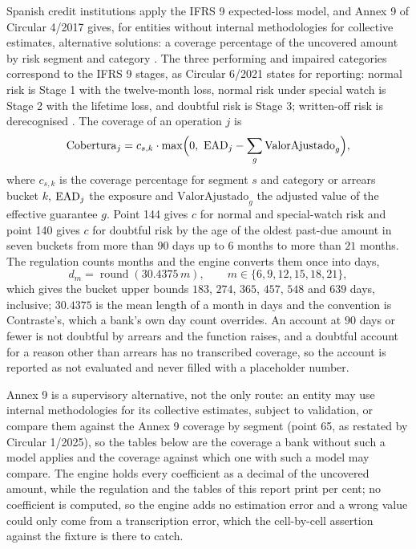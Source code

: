 Spanish credit institutions apply the IFRS 9 expected-loss model, and Annex 9 of Circular 4/2017 gives, for entities without internal methodologies for collective estimates, alternative solutions: a coverage percentage of the uncovered amount by risk segment and category
\citep{provisions:bde2017}. The three performing and impaired categories correspond to the IFRS 9 stages, as Circular 6/2021 states for reporting: normal risk is Stage 1 with the twelve-month loss, normal risk under special watch is Stage 2 with the lifetime loss, and doubtful risk is Stage 3; written-off risk is derecognised
\citep{provisions:bde2021}. The coverage of an operation $j$ is
\begin{equation}
\mathrm{Cobertura}_j=c_{s,k}\cdot\max\Bigl(0,\ \EAD_j-\sum_{g}\mathrm{ValorAjustado}_g\Bigr),
\label{eq:prov-annex9}
\end{equation}
where $c_{s,k}$ is the coverage percentage for segment $s$ and category or arrears bucket $k$, $\mathrm{EAD}_j$ the exposure and $\mathrm{ValorAjustado}_g$ the adjusted value of the effective guarantee $g$. Point 144 gives $c$ for normal and special-watch risk and point 140 gives $c$ for doubtful risk by the age of the oldest
past-due amount in seven buckets from more than $90$ days up to $6$ months to more than $21$ months. The regulation counts months and the engine converts them once into days,
\begin{equation}
d_m=\operatorname{round}(30.4375\,m),\qquad m\in\{6,9,12,15,18,21\},
\label{eq:prov-annex9-days}
\end{equation}
which gives the bucket upper bounds $183$, $274$, $365$, $457$, $548$ and $639$ days, inclusive; $30.4375$ is the mean length of a month in days and the convention is Contraste's, which a bank's own day count overrides. An account at $90$ days or fewer is not doubtful by arrears and the function raises, and a doubtful account for a reason other than arrears
has no transcribed coverage, so the account is reported as not evaluated and never filled with a placeholder number.

Annex 9 is a supervisory alternative, not the only route: an entity may use internal methodologies for its collective estimates, subject to validation, or compare them against the Annex 9 coverage by segment (point 65, as restated by Circular 1/2025), so the tables below are the coverage a bank without such a model applies and the coverage against which one with such a model may compare. The engine holds every coefficient as a decimal of the uncovered amount, while the regulation and the tables of this report print per cent; no coefficient is computed, so the engine adds no estimation error and a wrong value could only come from a transcription error, which the cell-by-cell assertion against the fixture is there to catch.

